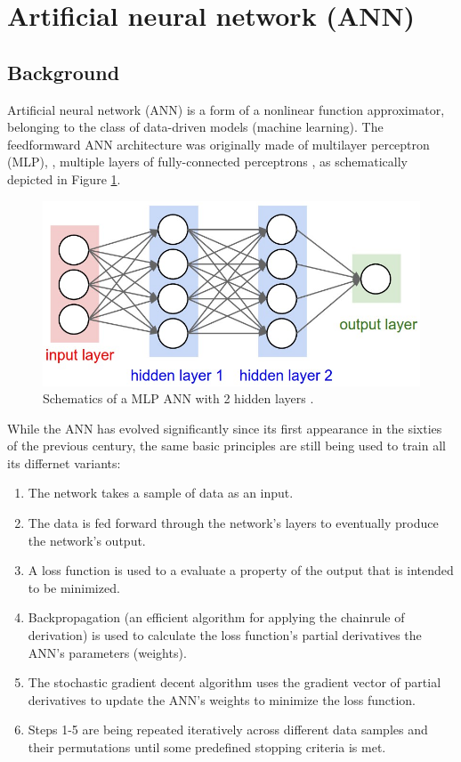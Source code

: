\section{Artificial neural network (ANN)} \label{sec:ANN}
\subsection{Background}
Artificial neural network (ANN) is a form of a nonlinear function approximator, belonging to the class of data-driven models (\aka machine learning).
The feedformward ANN architecture was originally made of multilayer perceptron (MLP), \ie, multiple layers of fully-connected perceptrons \cite{rosenblatt1957perceptron}, as schematically depicted in Figure \ref{fig:fully_connected}.
\begin{figure}[H]
    \centering
    \includegraphics[width=0.6\linewidth]{../figs/related_work/fully_connected.jpeg}
    \caption{Schematics of a MLP ANN with 2 hidden layers \cite{dabbura_2022}.}
    \label{fig:fully_connected}
\end{figure}

While the ANN has evolved significantly since its first appearance in the sixties of the previous century, the same basic principles are still being used to train all its differnet variants:
\begin{enumerate}
    \item The network takes a sample of data as an input.
    \item The data is fed forward through the network's layers to eventually produce the network's output.
    \item A loss function is used to a evaluate a property of the output that is intended to be minimized.
    \item Backpropagation (an efficient algorithm for applying the chainrule of derivation) is used to calculate the loss function's partial derivatives \wrt the ANN's parameters (\aka weights).
    \item The stochastic gradient decent algorithm \cite{cauchy1847methode} uses the gradient vector of partial derivatives to  update the ANN's weights to minimize the loss function.
    \item Steps 1-5 are being repeated iteratively across different data samples and their permutations until some predefined stopping criteria is met.
\end{enumerate}

